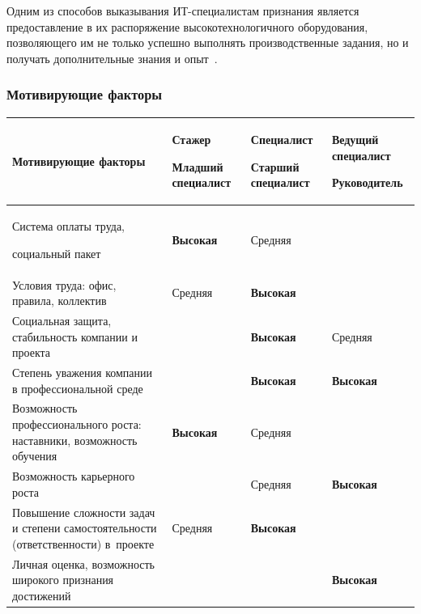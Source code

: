 \documentclass{../industrial-development}
\begin{document}
Одним из способов выказывания ИТ-специалистам признания является предоставление в их распоряжение высокотехнологичного оборудования, позволяющего им не только успешно выполнять производственные задания, но и получать дополнительные знания и опыт~\cite{Hahalin}.


\begin{frame} \frametitle{Мотивирующие факторы}
  
	\begin{table}[h]
	\begin{center}
\begin{tabular}{|p{4cm}|p{}|p{2cm}|p{2cm}|}
\hline
\tiny \textbf{Мотивирующие факторы} & \tiny \textbf{Стажер} 

\tiny \textbf{Младший специалист} & \tiny \textbf{Специалист} 

\tiny \textbf{Старший специалист} & \tiny \textbf{Ведущий специалист} 

\tiny \textbf{Руководитель} \\
\hline
\tiny Система оплаты труда, 

социальный пакет & \tiny \textbf{Высокая} & \tiny Средняя & \tiny \\
\hline
\tiny Условия труда: офис, правила, коллектив & \tiny Средняя & \tiny \textbf{Высокая} & \\
\hline
\tiny Социальная защита, стабильность компании и проекта &  & \tiny \textbf{Высокая}  & \tiny Средняя \\
\hline
 \tiny Степень уважения компании в профессиональной среде &  & \tiny \textbf{Высокая} & \tiny \textbf{Высокая} \\
\hline
\tiny Возможность профессионального роста: наставники, возможность обучения  & \tiny \textbf{Высокая} & \tiny Средняя & \\ 
\hline
\tiny Возможность карьерного роста & & \tiny Средняя & \tiny \textbf{Высокая} \\
\hline
\tiny Повышение сложности задач и степени самостоятельности (ответственности) в~проекте & \tiny Средняя & \tiny\textbf{Высокая} & \\
\hline
\tiny Личная оценка, возможность широкого признания достижений & & & \tiny \textbf{Высокая} \\

\hline
\end{tabular}
\end{center}
\end{table}
\end{frame}
\end{document}

